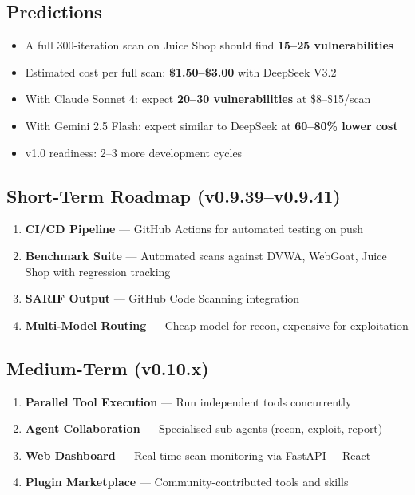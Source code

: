 \documentclass[11pt,a4paper]{article}
\begin{document}
\subsection{Predictions}
\begin{itemize}[noitemsep]
  \item A full 300-iteration scan on Juice Shop should find \textbf{15--25 vulnerabilities}
  \item Estimated cost per full scan: \textbf{\$1.50--\$3.00} with DeepSeek V3.2
  \item With Claude Sonnet 4: expect \textbf{20--30 vulnerabilities} at \$8--\$15/scan
  \item With Gemini 2.5 Flash: expect similar to DeepSeek at \textbf{60--80\% lower cost}
  \item v1.0 readiness: 2--3 more development cycles
\end{itemize}

\subsection{Short-Term Roadmap (v0.9.39--v0.9.41)}
\begin{enumerate}[noitemsep]
  \item \textbf{CI/CD Pipeline} --- GitHub Actions for automated testing on push
  \item \textbf{Benchmark Suite} --- Automated scans against DVWA, WebGoat, Juice Shop with regression tracking
  \item \textbf{SARIF Output} --- GitHub Code Scanning integration
  \item \textbf{Multi-Model Routing} --- Cheap model for recon, expensive for exploitation
\end{enumerate}

\subsection{Medium-Term (v0.10.x)}
\begin{enumerate}[noitemsep]
  \item \textbf{Parallel Tool Execution} --- Run independent tools concurrently
  \item \textbf{Agent Collaboration} --- Specialised sub-agents (recon, exploit, report)
  \item \textbf{Web Dashboard} --- Real-time scan monitoring via FastAPI + React
  \item \textbf{Plugin Marketplace} --- Community-contributed tools and skills
\end{enumerate}
\end{document}

